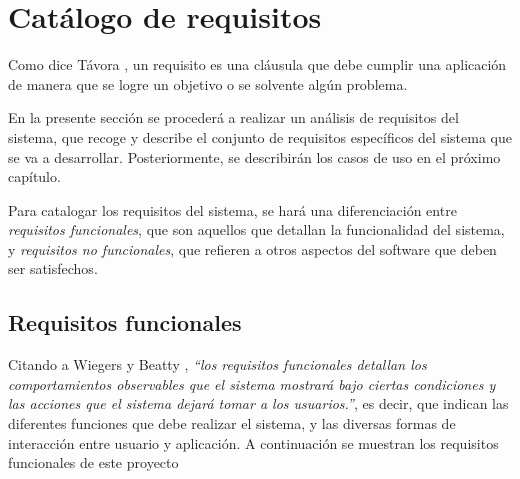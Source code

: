 
\section{Catálogo de requisitos} \label{Requisitos}
Como dice Távora \autocite*{Tavora2014}, un requisito es una cláusula 
que debe cumplir una aplicación de manera que se logre un objetivo 
o se solvente algún problema. \medskip

En la presente sección se procederá a realizar un análisis de 
requisitos del sistema, que recoge y describe el conjunto 
de requisitos específicos del sistema que se va a desarrollar.
Posteriormente, se describirán los casos de uso en el próximo capítulo. \medskip

Para catalogar los requisitos del sistema, se hará una diferenciación entre 
\textit{requisitos funcionales}, que son aquellos que detallan 
la funcionalidad del sistema, y \textit{requisitos no funcionales},
que refieren a otros aspectos del software que deben ser satisfechos.

\subsection{Requisitos funcionales} \label{Requisitos_funcionales}
Citando a Wiegers y Beatty \autocite*{Wiegers2013}, \textit{“los requisitos funcionales 
detallan los comportamientos observables que el sistema mostrará bajo ciertas condiciones 
y las acciones que el sistema dejará tomar a los usuarios.”}, es decir, que indican las 
diferentes funciones que debe realizar el sistema, y las diversas formas de interacción 
entre usuario y aplicación. A continuación se muestran los requisitos funcionales 
de este proyecto \medskip

